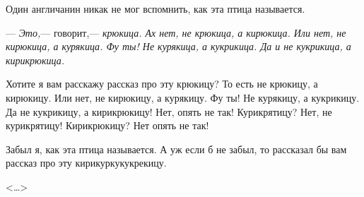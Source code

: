 Один англичанин никак не мог вспомнить, как эта птица называется.

--- \textit{Это,}--- говорит,--- \textit{крюкица. Ах нет, не крюкица, а кирюкица. Или нет, не кирюкица, а курякица. Фу ты! Не курякица, а кукрикица. Да и не кукрикица, а кирикрюкица.}

Хотите я вам расскажу рассказ про эту крюкицу? То есть не крюкицу, а кирюкицу. Или нет, не кирюкицу, а курякицу. Фу ты! Не курякицу, а кукрикицу. Да не кукрикицу, а кирикрюкицу! Нет, опять не так! Курикрятицу? Нет, не курикрятицу! Кирикрюкицу? Нет опять не так!

Забыл я, как эта птица называется. А уж если б не забыл, то рассказал бы вам рассказ про эту кирикуркукукрекицу.

\begin{flushright}
<\dots>
\end{flushright}